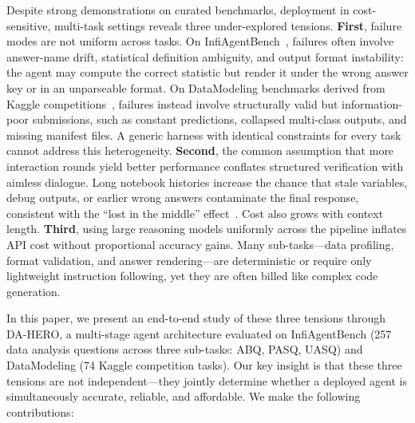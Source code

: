 \documentclass[letterpaper]{article} %
\begin{document}
Despite strong demonstrations on curated benchmarks, deployment in cost-sensitive, multi-task settings reveals three under-explored tensions. \textbf{First}, failure modes are not uniform across tasks. On InfiAgentBench~\cite{infiagentbench}, failures often involve answer-name drift, statistical definition ambiguity, and output format instability: the agent may compute the correct statistic but render it under the wrong answer key or in an unparseable format. On DataModeling benchmarks derived from Kaggle competitions~\cite{kaggle}, failures instead involve structurally valid but information-poor submissions, such as constant predictions, collapsed multi-class outputs, and missing manifest files. A generic harness with identical constraints for every task cannot address this heterogeneity. \textbf{Second}, the common assumption that more interaction rounds yield better performance conflates structured verification with aimless dialogue. Long notebook histories increase the chance that stale variables, debug outputs, or earlier wrong answers contaminate the final response, consistent with the ``lost in the middle'' effect~\cite{liu2024lost}. Cost also grows with context length. \textbf{Third}, using large reasoning models uniformly across the pipeline inflates API cost without proportional accuracy gains. Many sub-tasks---data profiling, format validation, and answer rendering---are deterministic or require only lightweight instruction following, yet they are often billed like complex code generation.

In this paper, we present an end-to-end study of these three tensions through DA-HERO, a multi-stage agent architecture evaluated on InfiAgentBench (257 data analysis questions across three sub-tasks: ABQ, PASQ, UASQ) and DataModeling (74 Kaggle competition tasks). Our key insight is that these three tensions are not independent---they jointly determine whether a deployed agent is simultaneously accurate, reliable, and affordable. We make the following contributions:
\end{document}
